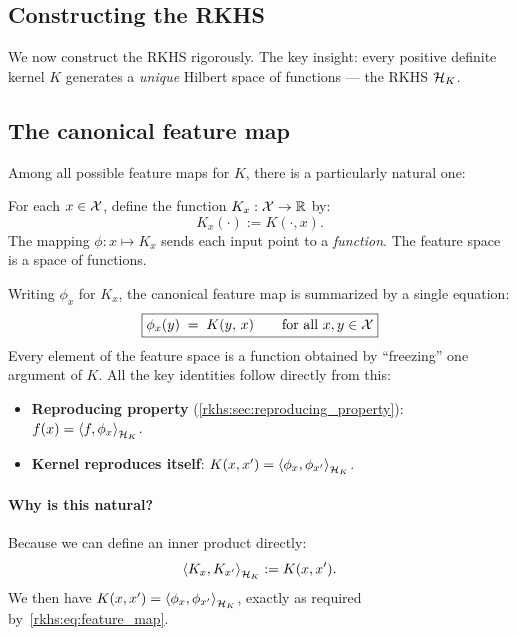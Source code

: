 \begin{notechapter}
\section{Constructing the RKHS}
\label{rkhs:sec:rkhs_construction}

We now construct the RKHS rigorously. The key insight: every positive
definite kernel $K$ generates a \emph{unique} Hilbert space of functions
--- the RKHS $\mathcal{H}_K$.

\subsection{The canonical feature map}
\label{rkhs:subsec:canonical_feature_map}

Among all possible feature maps for $K$, there is a particularly natural one:

\begin{definition}
\label{rkhs:def:canonical_feature}
For each $x \in \mathcal{X}$, define the function
$K_x: \mathcal{X} \to \mathbb{R}$ by:
\[
K_x(\cdot) := K(\cdot, x).
\]
The mapping $\phi: x \mapsto K_x$ sends each input
point to a \emph{function}. The feature space is a
space of functions.
\end{definition}

Writing $\phi_x$ for $K_x$, the canonical feature map
is summarized by a single equation:
\begin{equation}
\label{rkhs:eq:canonical_feature}
\boxed{\phi_x(y) \;=\; K(y,\, x)
  \qquad \text{for all } x, y \in \mathcal{X}}
\end{equation}
Every element of the feature space is a function
obtained by ``freezing'' one argument of $K$. All
the key identities follow directly from this:
\begin{itemize}
  \item \textbf{Reproducing property}
    (\cref{rkhs:sec:reproducing_property}):
    $f(x) = \left\langle f, \phi_x \right\rangle_{\mathcal{H}_K}$.
  \item \textbf{Kernel reproduces itself}:
    $K(x,x') = \left\langle \phi_x, \phi_{x'} \right\rangle_{\mathcal{H}_K}$.
\end{itemize}

\paragraph{Why is this natural?} Because we can define an
inner product directly:
\[
\left\langle K_x, K_{x'} \right\rangle_{\mathcal{H}_K} := K(x, x').
\]
We then have
$K(x,x') = \left\langle \phi_x, \phi_{x'} \right\rangle_{\mathcal{H}_K}$, exactly
as required by~\eqref{rkhs:eq:feature_map}.


\end{notechapter}
